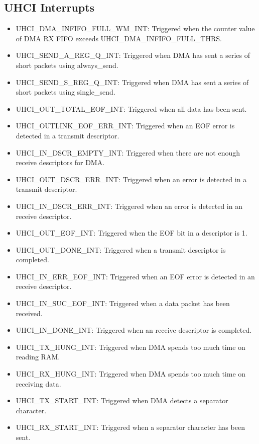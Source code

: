 \documentclass[main\_\_EN.tex]{subfiles}
\begin{document}
\subsection{UHCI Interrupts}
\begin{itemize}
\item \label{int:UHCIDMAINFIFOFULLWMINT}UHCI\_DMA\_INFIFO\_FULL\_WM\_INT: Triggered when the counter value of DMA RX FIFO exceeds UHCI\_DMA\_INFIFO\_FULL\_THRS.
\item \label{int:UHCISENDAREGQINT}UHCI\_SEND\_A\_REG\_Q\_INT: Triggered when DMA has sent a series of short packets using always\_send.
\item \label{int:UHCISENDSREGQINT}UHCI\_SEND\_S\_REG\_Q\_INT: Triggered when DMA has sent a series of short packets using single\_send.
\item \label{int:UHCIOUTTOTALEOFINT}UHCI\_OUT\_TOTAL\_EOF\_INT: Triggered when all data has been sent.
\item \label{int:UHCIOUTLINKEOFERRINT}UHCI\_OUTLINK\_EOF\_ERR\_INT: Triggered when an EOF error is detected in a transmit descriptor.
\item \label{int:UHCIINDSCREMPTYINT}UHCI\_IN\_DSCR\_EMPTY\_INT: Triggered when there are not enough receive descriptors for DMA.
\item \label{int:UHCIOUTDSCRERRINT}UHCI\_OUT\_DSCR\_ERR\_INT: Triggered when an error is detected in a transmit descriptor.
\item \label{int:UHCIINDSCRERRINT}UHCI\_IN\_DSCR\_ERR\_INT: Triggered when an error is detected in an receive descriptor.
\item \label{int:UHCIOUTEOFINT}UHCI\_OUT\_EOF\_INT: Triggered when the EOF bit in a descriptor is 1.
\item \label{int:UHCIOUTDONEINT}UHCI\_OUT\_DONE\_INT: Triggered when a transmit descriptor is completed.
\item \label{int:UHCIINERREOFINT}UHCI\_IN\_ERR\_EOF\_INT: Triggered when an EOF error is detected in an receive descriptor.
\item \label{int:UHCIINSUCEOFINT}UHCI\_IN\_SUC\_EOF\_INT: Triggered when a data packet has been received.
\item \label{int:UHCIINDONEINT}UHCI\_IN\_DONE\_INT: Triggered when an receive descriptor is completed.
\item \label{int:UHCITXHUNGINT}UHCI\_TX\_HUNG\_INT: Triggered when DMA spends too much time on reading RAM.
\item \label{int:UHCIRXHUNGINT}UHCI\_RX\_HUNG\_INT: Triggered when DMA spends too much time on receiving data.
\item \label{int:UHCITXSTARTINT}UHCI\_TX\_START\_INT: Triggered when DMA detects a separator character.
\item \label{int:UHCIRXSTARTINT}UHCI\_RX\_START\_INT: Triggered when a separator character has been sent.
\end{itemize}
\end{document}
